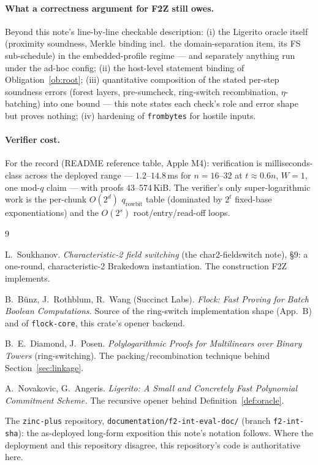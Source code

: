 \documentclass[11pt]{article}
\newcommand{\code}[1]{{\def\_{\textunderscore\allowbreak}\texttt{#1}}}
\begin{document}
\paragraph{What a correctness argument for F2Z still owes.}  Beyond this
note's line-by-line checkable description: (i) the Ligerito oracle
itself (proximity soundness, Merkle binding incl.\ the domain-separation
item, its FS sub-schedule) in the embedded-profile regime — and
separately anything run under the ad-hoc config; (ii) the host-level
statement binding of Obligation~\ref{ob:root}; (iii) quantitative
composition of the stated per-step soundness errors (forest layers,
pre-sumcheck, ring-switch recombination, $\eta$-batching) into one bound
— this note states each check's role and error shape but proves nothing;
(iv) hardening of \code{from\_bytes} for hostile inputs.

\paragraph{Verifier cost.}  For the record (README reference table,
Apple M4): verification is milliseconds-class across the deployed range —
$1.2$--$14.8$\,ms for $n = 16$--$32$ at $t \approx 0.6n$, $W=1$, one
mod-$q$ claim — with proofs 43--574\,KiB.  The verifier's only
super-logarithmic work is the per-chunk $O(2^{d})$
$q_{\mathrm{rowbit}}$ table (dominated by $2^t$ fixed-base
exponentiations) and the $O(2^s)$ root/entry/read-off loops.

\begin{thebibliography}{9}\small

L.~Soukhanov.
\emph{Characteristic-2 field switching} (the char2-fieldswitch note),
\S9: a one-round, characteristic-2 Brakedown instantiation.
The construction F2Z implements.

B.~B\"unz, J.~Rothblum, R.~Wang (Succinct Labs).
\emph{Flock: Fast Proving for Batch Boolean Computations.}
Source of the ring-switch implementation shape (App.~B) and of
\code{flock-core}, this crate's opener backend.

B.~E.~Diamond, J.~Posen.
\emph{Polylogarithmic Proofs for Multilinears over Binary Towers}
(ring-switching).  The packing/recombination technique behind
Section~\ref{sec:linkage}.

A.~Novakovic, G.~Angeris.
\emph{Ligerito: A Small and Concretely Fast Polynomial Commitment
Scheme.}  The recursive opener behind Definition~\ref{def:oracle}.

The \code{zinc-plus} repository,
\code{documentation/f2-int-eval-doc/} (branch \code{f2-int-sha}):
the as-deployed long-form exposition this note's notation follows.
Where the deployment and this repository disagree, this repository's
code is authoritative here.

\end{thebibliography}
\end{document}

